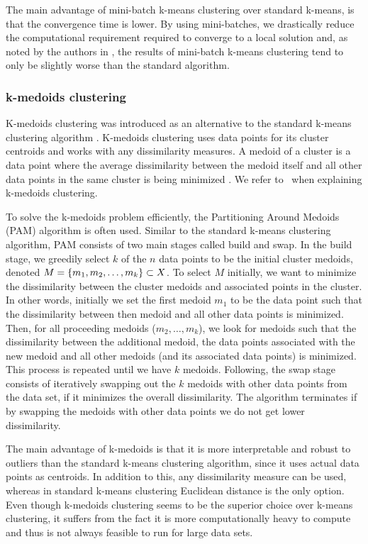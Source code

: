 The main advantage of mini-batch k-means clustering over standard k-means, is that the convergence time is lower. By using mini-batches, we drastically reduce the computational requirement required to converge to a local solution and, as noted by the authors in \cite{sculley2010}, the results of mini-batch k-means clustering tend to only be slightly worse than the standard algorithm.

\subsubsection{k-medoids clustering}
\label{sec:k-medoids-clustering}
K-medoids clustering was introduced as an alternative to the standard k-means clustering algorithm \cites{Kaufman1990}[p. 427 - 428]{bishop2006}. K-medoids clustering uses data points for its cluster centroids and works with any dissimilarity measures. A medoid of a cluster is a data point where the average dissimilarity between the medoid itself and all other data points in the same cluster is being minimized \cite{Kaufman1990}. We refer to \cites{Kaufman1990}[p. 427 - 428]{bishop2006}\, when explaining k-medoids clustering.

To solve the k-medoids problem efficiently, the Partitioning Around Medoids (PAM) algorithm is often used. Similar to the standard k-means clustering algorithm, PAM consists of two main stages called build and swap. In the build stage, we greedily select $k$ of the $n$ data points to be the initial cluster medoids, denoted $M = \left\{m_1, m_2, \ldots, m_k\right\} \subset X$. To select $M$ initially, we want to minimize the dissimilarity between the cluster medoids and associated points in the cluster. In other words, initially we set the first medoid $m_1$ to be the data point such that the dissimilarity between then medoid and all other data points is minimized. Then, for all proceeding medoids ($m_2, \ldots, m_k$), we look for medoids such that the dissimilarity between the additional medoid, the data points associated with the new medoid and all other medoids (and its associated data points) is minimized. This process is repeated until we have $k$ medoids. Following, the swap stage consists of iteratively swapping out the $k$ medoids with other data points from the data set, if it minimizes the overall dissimilarity. The algorithm terminates if by swapping the medoids with other data points we do not get lower dissimilarity.

The main advantage of k-medoids is that it is more interpretable and robust to outliers than the standard k-means clustering algorithm, since it uses actual data points as centroids. In addition to this, any dissimilarity measure can be used, whereas in standard k-means clustering Euclidean distance is the only option. Even though k-medoids clustering seems to be the superior choice over k-means clustering, it suffers from the fact it is more computationally heavy to compute and thus is not always feasible to run for large data sets.

